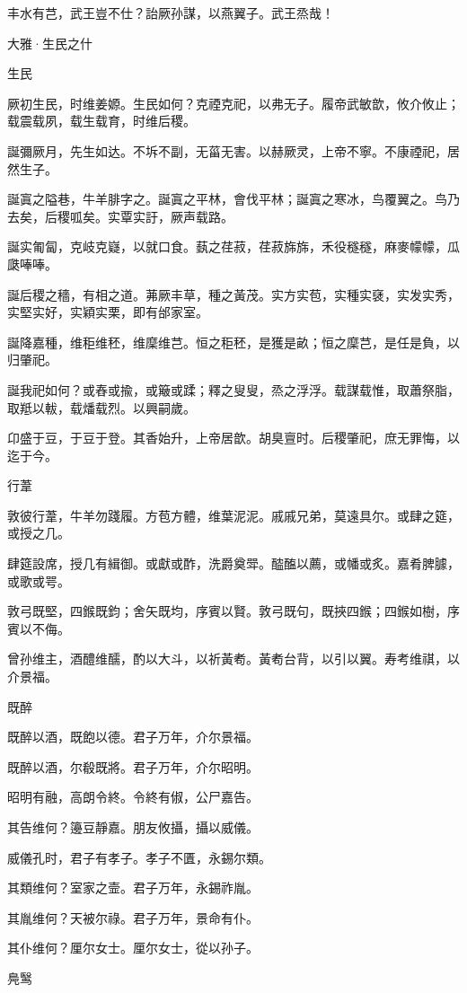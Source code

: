 丰水有芑，武王豈不仕？詒厥孙謀，以燕翼子。武王烝哉！




大雅·生民之什


生民

厥初生民，时维姜嫄。生民如何？克禋克祀，以弗无子。履帝武敏歆，攸介攸止；载震载夙，载生载育，时维后稷。

誕彌厥月，先生如达。不坼不副，无菑无害。以赫厥灵，上帝不寧。不康禋祀，居然生子。

誕寘之隘巷，牛羊腓字之。誕寘之平林，會伐平林；誕寘之寒冰，鸟覆翼之。鸟乃去矣，后稷呱矣。实覃实訏，厥声载路。

誕实匍匐，克岐克嶷，以就口食。蓺之荏菽，荏菽旆旆，禾役穟穟，麻麥幪幪，瓜瓞唪唪。

誕后稷之穡，有相之道。茀厥丰草，種之黃茂。实方实苞，实種实褎，实发实秀，实堅实好，实穎实栗，即有邰家室。

誕降嘉種，维秬维秠，维穈维芑。恒之秬秠，是獲是畝；恒之穈芑，是任是負，以归肇祀。

誕我祀如何？或舂或揄，或簸或蹂；釋之叟叟，烝之浮浮。载謀载惟，取蕭祭脂，取羝以軷，载燔载烈。以興嗣歲。

卬盛于豆，于豆于登。其香始升，上帝居歆。胡臭亶时。后稷肇祀，庶无罪悔，以迄于今。

行葦

敦彼行葦，牛羊勿踐履。方苞方體，维葉泥泥。戚戚兄弟，莫遠具尔。或肆之筵，或授之几。

肆筵設席，授几有緝御。或獻或酢，洗爵奠斝。醓醢以薦，或幡或炙。嘉肴脾臄，或歌或咢。

敦弓既堅，四鍭既鈞；舍矢既均，序賓以賢。敦弓既句，既挾四鍭；四鍭如樹，序賓以不侮。

曾孙维主，酒醴维醹，酌以大斗，以祈黃耇。黃耇台背，以引以翼。寿考维祺，以介景福。

既醉

既醉以酒，既飽以德。君子万年，介尔景福。

既醉以酒，尔殽既將。君子万年，介尔昭明。

昭明有融，高朗令終。令終有俶，公尸嘉告。

其告维何？籩豆靜嘉。朋友攸攝，攝以威儀。

威儀孔时，君子有孝子。孝子不匱，永錫尔類。

其類维何？室家之壸。君子万年，永錫祚胤。

其胤维何？天被尔祿。君子万年，景命有仆。

其仆维何？厘尔女士。厘尔女士，從以孙子。

鳧鹥

